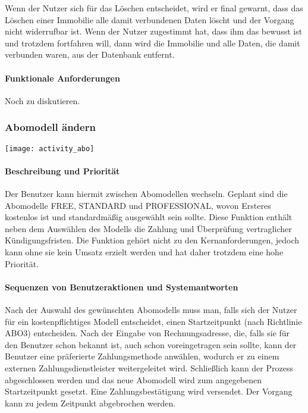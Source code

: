 Wenn der Nutzer sich für das Löschen entscheidet, wird er final gewarnt,
dass das Löschen einer Immobilie alle damit verbundenen Daten löscht und der Vorgang nicht widerrufbar ist.
Wenn der Nutzer zugestimmt hat, dass ihm das bewusst ist und trotzdem fortfahren will,
dann wird die Immobilie und alle Daten, die damit verbunden waren, aus der Datenbank entfernt.

\paragraph{Funktionale Anforderungen}
Noch zu diskutieren.

\subsubsection{Abomodell ändern}
\texttt{[image: activity\_abo]}

\paragraph{Beschreibung und Priorität}
Der Benutzer kann hiermit zwischen Abomodellen wechseln.
Geplant sind die Abomodelle FREE, STANDARD und PROFESSIONAL,
wovon Ersteres kostenlos ist und standardmäßig ausgewählt sein sollte.
Diese Funktion enthält neben dem Auswählen des Modells die Zahlung und Überprüfung vertraglicher Kündigungsfristen.
Die Funktion gehört nicht zu den Kernanforderungen, jedoch kann ohne sie kein Umsatz erzielt werden
und hat daher trotzdem eine hohe Priorität.
\paragraph{Sequenzen von Benutzeraktionen und Systemantworten}
Nach der Auswahl des gewünschten Abomodells muss man, falls sich der Nutzer für ein kostenpflichtiges Modell entscheidet,
einen Startzeitpunkt (nach Richtlinie ABO3) entscheiden.
Nach der Eingabe von Rechnungsadresse, die, falls sie für den Benutzer schon bekannt ist,
auch schon voreingetragen sein sollte, kann der Benutzer eine präferierte Zahlungsmethode anwählen,
wodurch er zu einem externen Zahlungsdienstleister weitergeleitet wird.
Schließlich kann der Prozess abgeschlossen werden und das neue Abomodell wird zum angegebenen Startzeitpunkt gesetzt.
Eine Zahlungsbestätigung wird versendet.
Der Vorgang kann zu jedem Zeitpunkt abgebrochen werden.

